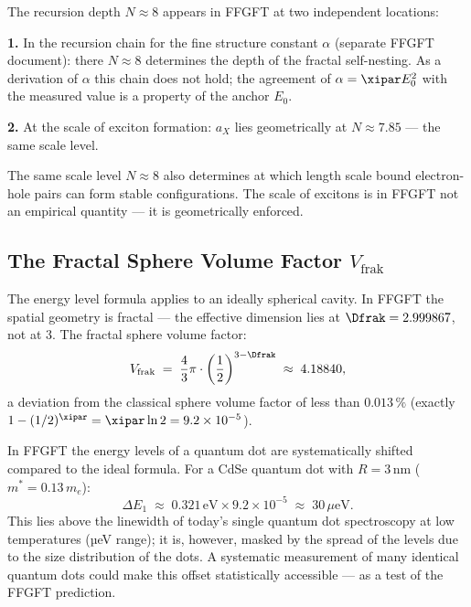 \begin{foundation}
The recursion depth $N \approx 8$ appears in FFGFT
at two independent locations:

\textbf{1.} In the recursion chain for the fine structure constant $\alpha$
(separate FFGFT document): there $N \approx 8$ determines the depth of the
fractal self-nesting. As a derivation of $\alpha$ this chain does not hold;
the agreement of $\alpha = \xipar E_0^2$ with the measured value
is a property of the anchor $E_0$.

\textbf{2.} At the scale of exciton formation: $a_X$ lies geometrically
at $N \approx 7.85$ --- the same scale level.

The same scale level $N \approx 8$
also determines at which length scale bound
electron-hole pairs can form stable configurations.
The scale of excitons is in FFGFT not an empirical quantity ---
it is geometrically enforced.
\end{foundation}

\subsection{The Fractal Sphere Volume Factor \texorpdfstring{$V_{\text{frak}}$}{V\_frak}}
\label{sec:kfrak}

The energy level formula applies to an ideally spherical cavity.
In FFGFT the spatial geometry is fractal --- the effective dimension
lies at $\Dfrak = 2.999867$, not at 3.
The fractal sphere volume factor:
\begin{equation}
  V_{\text{frak}} \;=\; \frac{4}{3}\pi \cdot
  \left(\frac{1}{2}\right)^{3 - \Dfrak}
  \;\approx\; 4.18840,
\end{equation}
a deviation from the classical sphere volume factor of less
than $0.013\,\%$ (exactly $1 - (1/2)^{\xipar} = \xipar\ln 2 = 9.2 \times 10^{-5}$).

\begin{keyresult}
In FFGFT the energy levels of a quantum dot are systematically
shifted compared to the ideal formula. For a CdSe quantum dot
with $R = 3$\,nm ($m^* = 0.13\,m_e$):
\[
  \Delta E_1 \;\approx\; 0.321\,\text{eV} \times 9.2 \times 10^{-5}
  \;\approx\; 30\,\mu\text{eV}.
\]
This lies above the linewidth of today's
single quantum dot spectroscopy at low temperatures (µeV range);
it is, however, masked by the spread of the levels due to the size distribution of the dots.
A systematic measurement of many identical quantum dots
could make this offset statistically accessible ---
as a test of the FFGFT prediction.
\end{keyresult}

